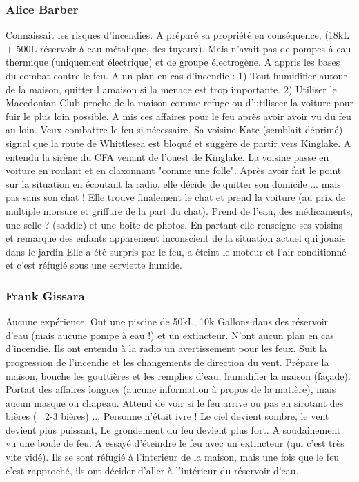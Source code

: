             \subsubsection{Alice Barber}
                Connaissait les risques d'incendies.
                A préparé sa propriété en conséquence, (18kL + 500L réservoir à eau métalique, des tuyaux).
                Mais n'avait pas de pompes à eau thermique (uniquement électrique) et de groupe électrogène.
                A appris les bases du combat contre le feu.
                A un plan en cas d'incendie :
                1) Tout humidifier autour de la maison, quitter l amaison si la menace est trop importante.
                2) Utiliser le Macedonian Club proche de la maison comme refuge ou d'utiliseer la voiture pour fuir le plus loin possible.
                A mis ces affaires pour le feu après avoir avoir vu du feu au loin. Veux combattre le feu si nécessaire.
                Sa voisine Kate (semblait déprimé) signal que la route de Whittlesea est bloqué et suggère de partir vers Kinglake.
                A entendu la sirène du CFA venant de l'ouest de Kinglake.
                La voisine passe en voiture en roulant et en claxonnant "comme une folle".
                Après avoir fait le point sur la situation en écoutant la radio, elle décide de quitter son domicile ... mais pas sans son chat !
                Elle trouve finalement le chat et prend la voiture (au prix de multiple morsure et griffure de la part du chat).
                Prend de l'eau, des médicaments, une selle ? (saddle) et une boite de photos.
                En partant elle renseigne ses voisins et remarque des enfants apparement inconscient de la situation actuel qui jouais dans le jardin
                Elle a été surpris par le feu, a éteint le moteur et l'air conditionné et c'est réfugié sous une serviette humide.

            \subsubsection{Frank Gissara}
                Aucune expérience.
                Ont une piscine de 50kL, 10k Gallons dans des réservoir d'eau (mais aucune pompe à eau !) et un extincteur.
                N'ont aucun plan en cas d'incendie.
                Ils ont entendu à la radio un avertissement pour les feux.
                Suit la progression de l'incendie et les changements de direction du vent.
                Prépare la maison, bouche les gouttières et les remplies d'eau, humidifier la maison (façade).
                Portait des affaires longues (aucune information à propos de la matière), mais aucun masque ou chapeau.
                Attend de voir si le feu arrive ou pas en sirotant des bières (~ 2-3 bières) ...
                Personne n'était ivre !
                Le ciel devient sombre, le vent devient plus puissant,
                Le grondement du feu devient plus fort.
                A soudainement vu une boule de feu.
                A essayé d'éteindre le feu avec un extincteur (qui c'est très vite vidé).
                Ils se sont réfugié à l'interieur de la maison, mais une fois que le feu c'est rapproché, ils ont décider d'aller à l'intérieur
                du réservoir d'eau.

